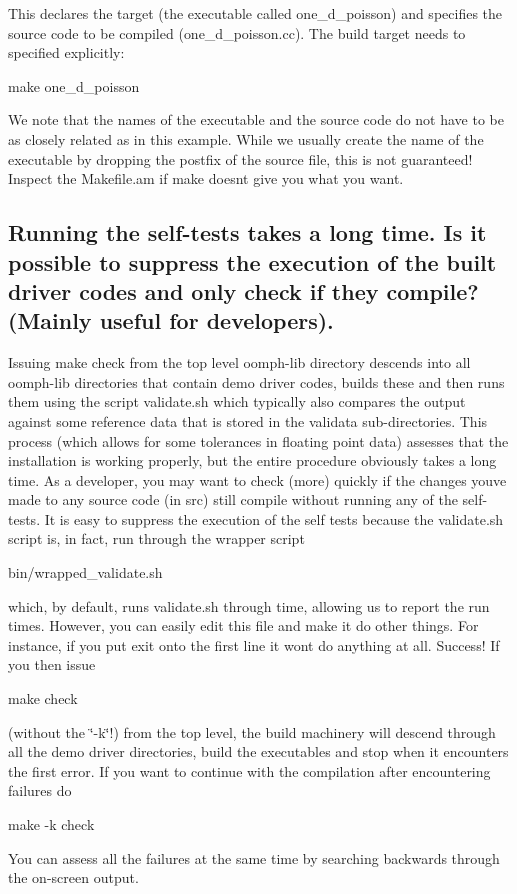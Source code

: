  This declares the target (the executable called {\ttfamily one\+\_\+d\+\_\+poisson}) and specifies the source code to be compiled ({\ttfamily one\+\_\+d\+\_\+poisson.\+cc}). The build target needs to specified explicitly\+: 
\begin{DoxyCode}
make one\_d\_poisson
\end{DoxyCode}
 We note that the names of the executable and the source code do not have to be as closely related as in this example. While we usually create the name of the executable by dropping the postfix of the source file, this is not guaranteed! Inspect the {\ttfamily Makefile.\+am} if {\ttfamily make} doesn\textquotesingle{}t give you what you want.



\hypertarget{index_only_compile_dont_run}{}\subsection{Running the self-\/tests takes a long time. Is it possible to suppress the execution of the built driver codes and only check if they compile? (\+Mainly useful for developers).}\label{index_only_compile_dont_run}
Issuing {\ttfamily make} {\ttfamily check} from the top level {\ttfamily oomph-\/lib} directory descends into all oomph-\/lib directories that contain demo driver codes, builds these and then runs them using the script {\ttfamily validate.\+sh} which typically also compares the output against some reference data that is stored in the {\ttfamily validata} sub-\/directories. This process (which allows for some tolerances in floating point data) assesses that the installation is working properly, but the entire procedure obviously takes a long time. As a developer, you may want to check (more) quickly if the changes you\textquotesingle{}ve made to any source code (in {\ttfamily src}) still compile without running any of the self-\/tests. It is easy to suppress the execution of the self tests because the {\ttfamily validate.\+sh} script is, in fact, run through the wrapper script 
\begin{DoxyCode}
bin/wrapped\_validate.sh
\end{DoxyCode}
 which, by default, runs {\ttfamily validate.\+sh} through {\ttfamily time}, allowing us to report the run times. However, you can easily edit this file and make it do other things. For instance, if you put {\ttfamily exit} onto the first line it won\textquotesingle{}t do anything at all. Success! If you then issue 
\begin{DoxyCode}
make check
\end{DoxyCode}
 (without the \char`\"{}-\/k\char`\"{}!) from the top level, the build machinery will descend through all the demo driver directories, build the executables and stop when it encounters the first error. If you want to continue with the compilation after encountering failures do 
\begin{DoxyCode}
make -k check
\end{DoxyCode}
 You can assess all the failures at the same time by searching backwards through the on-\/screen output.

